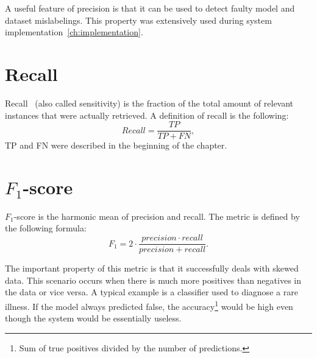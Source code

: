 A useful feature of precision is that it can be used to detect faulty model and dataset mislabelings.
This property was extensively used during system implementation~\ref{ch:implementation}.

\section{Recall}\label{sec:recall}
Recall~\cite{PreRec} (also called sensitivity) is the fraction of the total amount of relevant instances that were
actually retrieved.
A definition of recall is the following:
\begin{equation}
    Recall = \frac{TP}{TP + FN},
\end{equation}
TP and FN were described in the beginning of the chapter.

\section{$F_1$-score}\label{sec:f-score}
$F_1$-score is the harmonic mean of precision and recall.
The metric is defined by the following formula:
\begin{equation}
    F_1 = 2 \cdot \frac{precision \cdot recall}{precision + recall}.
\end{equation}

The important property of this metric is that it successfully deals with skewed data.
This scenario occurs when there is much more positives than negatives in the data or vice versa.
A typical example is a classifier used to diagnose a rare illness.
If the model always predicted false, the accuracy\footnote{Sum of true positives divided by the number of predictions.}
would be high even though the system would be essentially useless.